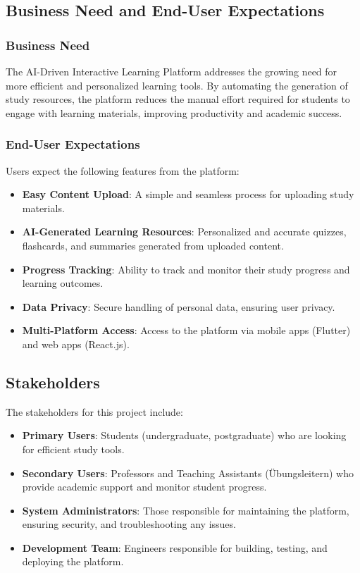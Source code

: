 \documentclass{article}
\begin{document}
\subsection{Business Need and End-User Expectations}
\subsubsection{Business Need}
The AI-Driven Interactive Learning Platform addresses the growing need for more efficient and personalized learning tools. By automating the generation of study resources, the platform reduces the manual effort required for students to engage with learning materials, improving productivity and academic success.

\subsubsection{End-User Expectations}
Users expect the following features from the platform:
\begin{itemize}
    \item \textbf{Easy Content Upload}: A simple and seamless process for uploading study materials.
    \item \textbf{AI-Generated Learning Resources}: Personalized and accurate quizzes, flashcards, and summaries generated from uploaded content.
    \item \textbf{Progress Tracking}: Ability to track and monitor their study progress and learning outcomes.
    \item \textbf{Data Privacy}: Secure handling of personal data, ensuring user privacy.
    \item \textbf{Multi-Platform Access}: Access to the platform via mobile apps (Flutter) and web apps (React.js).
\end{itemize}

\subsection{Stakeholders}
The stakeholders for this project include:
\begin{itemize}
    \item \textbf{Primary Users}: Students (undergraduate, postgraduate) who are looking for efficient study tools.
    \item \textbf{Secondary Users}: Professors and Teaching Assistants (Übungsleitern) who provide academic support and monitor student progress.
    \item \textbf{System Administrators}: Those responsible for maintaining the platform, ensuring security, and troubleshooting any issues.
    \item \textbf{Development Team}: Engineers responsible for building, testing, and deploying the platform.
\end{itemize}
\end{document}

